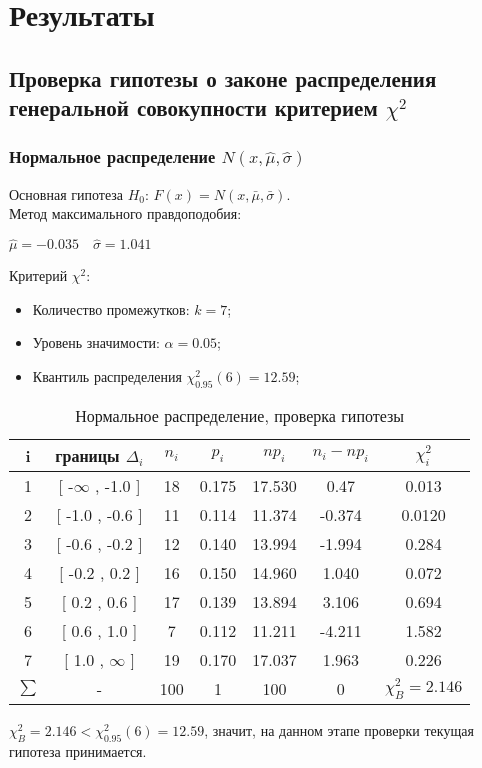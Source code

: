 \documentclass[12pt,a4paper]{article}
\begin{document}
		\section{Результаты}
			\subsection{Проверка гипотезы о законе распределения генеральной совокупности критерием $\chi^2$}
				\subsubsection{Нормальное распределение $N(x, \hat{\mu}, \hat{\sigma})$}
				Основная гипотеза $H_0$: $F(x) = N(x, \bar{\mu}, \bar{\sigma})$.\\
				Метод максимального правдоподобия:
				\begin{center}
					$\hat{\mu}=-0.035 \quad \hat{\sigma} = 1.041$
				\end{center}
				Критерий $\chi^2:$
				\begin{itemize}
					\item Количество промежутков: $k=7$;
					\item Уровень значимости: $\alpha=0.05$;
					\item Квантиль распределения $\chi^2_{0.95}(6)=12.59$;
				\end{itemize}
				\begin{table}[h!]
					\begin{center}
						\begin{tabular}{|c|c|c|c|c|c|c|}
							\hline
							i & границы $\Delta_i$ & $n_i$ & $p_i$ & $np_i$ & $n_i-np_i$ & $\chi_i^2$ \\ \hline
							1 & [ -$\infty$ , -1.0 ] & 18 & 0.175 & 17.530 & 0.47 & 0.013 \\ \hline
							2 & [ -1.0 , -0.6 ] & 11 & 0.114 & 11.374 & -0.374 & 0.0120 \\ \hline
							3 & [ -0.6 , -0.2 ] & 12 & 0.140 & 13.994 & -1.994 & 0.284 \\ \hline
							4 & [ -0.2 , 0.2 ] & 16 & 0.150 & 14.960 & 1.040 & 0.072 \\ \hline
							5 & [ 0.2 , 0.6 ] & 17 & 0.139 & 13.894 & 3.106 & 0.694 \\ \hline
							6 & [ 0.6 , 1.0 ] & 7 & 0.112 & 11.211 & -4.211 & 1.582 \\ \hline
							7 & [ 1.0 , $\infty$ ] & 19 & 0.170 & 17.037 & 1.963 & 0.226 \\ \hline
							$\sum$ & - & 100 & 1 & 100 & 0 & $\chi_B^2=2.146$ \\ \hline
						\end{tabular}
					\caption{Нормальное распределение, проверка гипотезы}
					\end{center}
				\end{table}
				$\chi_B^2 = 2.146 <  \chi^2_{0.95}(6)=12.59$, значит, на данном этапе проверки текущая гипотеза принимается.
				
\end{document}

